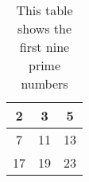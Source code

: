 \begin{table}[htbp]
\centering
\begin{tabular}{ |c|c|c| } 
 \hline
 2 & 3 & 5 \\ \hline
 7 & 11 & 13 \\ \hline
 17 & 19 & 23 \\ \hline
\end{tabular}
 \label{tab:primes}
 \caption{This table shows the first nine prime numbers}
\end{table}